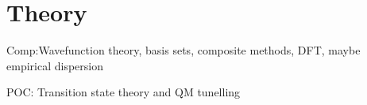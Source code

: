 \chapter{Theory}
\label{ch:theory}

Comp:Wavefunction theory, basis sets, composite methods, DFT, maybe empirical
dispersion

POC: Transition state theory and QM tunelling

